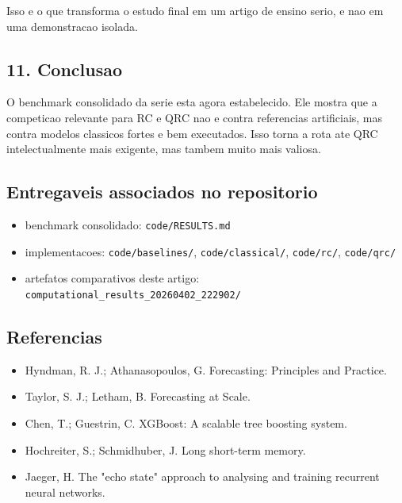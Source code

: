 \documentclass[12pt]{article}
\providecommand{\tightlist}{%
          \setlength{\itemsep}{0pt}\setlength{\parskip}{0pt}}
\begin{document}
Isso e o que transforma o estudo final em um artigo de ensino serio, e nao em uma demonstracao isolada.

\subsection{11. Conclusao}\label{11-conclusao}

O benchmark consolidado da serie esta agora estabelecido. Ele mostra que a competicao relevante para RC e QRC nao e contra referencias artificiais, mas contra modelos classicos fortes e bem executados. Isso torna a rota ate QRC intelectualmente mais exigente, mas tambem muito mais valiosa.

\subsection{Entregaveis associados no repositorio}\label{entregaveis-associados-no-repositorio}

\begin{itemize}
\tightlist
\item
  benchmark consolidado: \texttt{code/RESULTS.md}
\item
  implementacoes: \texttt{code/baselines/}, \texttt{code/classical/}, \texttt{code/rc/}, \texttt{code/qrc/}
\item
  artefatos comparativos deste artigo: \texttt{computational\_results\_20260402\_222902/}
\end{itemize}

\subsection{Referencias}\label{referencias}

\begin{itemize}
\tightlist
\item
  Hyndman, R. J.; Athanasopoulos, G. Forecasting: Principles and Practice.
\item
  Taylor, S. J.; Letham, B. Forecasting at Scale.
\item
  Chen, T.; Guestrin, C. XGBoost: A scalable tree boosting system.
\item
  Hochreiter, S.; Schmidhuber, J. Long short-term memory.
\item
  Jaeger, H. The "echo state" approach to analysing and training recurrent neural networks.
\end{itemize}

        
\end{document}
